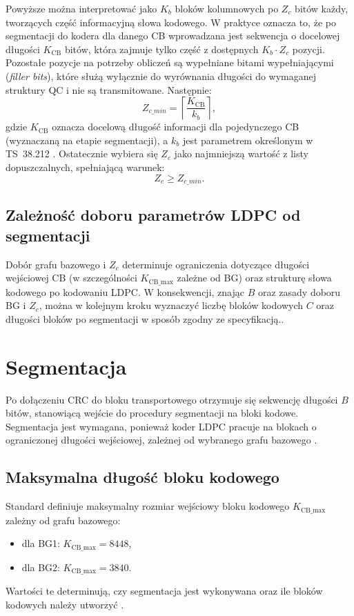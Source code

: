 Powyższe można interpretować jako $K_b$ bloków kolumnowych po $Z_c$ bitów każdy, tworzących część informacyjną słowa kodowego. W praktyce oznacza to, że po segmentacji do kodera dla danego CB wprowadzana jest sekwencja o docelowej długości $K_{\mathrm{CB}}$ bitów, która zajmuje tylko część z dostępnych $K_b \cdot Z_c$ pozycji. Pozostałe pozycje na potrzeby obliczeń są wypełniane bitami wypełniającymi (\emph{filler bits}), które służą wyłącznie do wyrównania długości do wymaganej struktury QC i nie są transmitowane. Następnie:
\begin{equation}
  Z_{c\_min} = \left\lceil \frac{K_{\mathrm{CB}}}{k_b} \right\rceil,
  \label{eq:zc_min}
\end{equation}
gdzie $K_{\mathrm{CB}}$ oznacza docelową długość informacji dla pojedynczego CB (wyznaczaną na etapie segmentacji), a $k_b$ jest parametrem określonym w TS~38.212 \cite{bib:3gpp_38212}. Ostatecznie wybiera się $Z_c$ jako najmniejszą wartość z listy dopuszczalnych, spełniającą warunek:
\begin{equation}
  Z_c \ge Z_{c\_min}.
  \label{eq:zc_choice}
\end{equation}

\subsection{Zależność doboru parametrów LDPC od segmentacji}
Dobór grafu bazowego i $Z_c$ determinuje ograniczenia dotyczące długości wejściowej CB (w szczególności $K_{\mathrm{CB\_max}}$ zależne od BG) oraz strukturę słowa kodowego po kodowaniu LDPC. W konsekwencji, znając $B$ oraz zasady doboru BG i $Z_c$, można w kolejnym kroku wyznaczyć liczbę bloków kodowych $C$ oraz długości bloków po segmentacji w sposób zgodny ze specyfikacją.\cite{bib:3gpp_38212}.





\section{Segmentacja}
\label{sec:analiza_segmentacja}

Po dołączeniu CRC do bloku transportowego otrzymuje się sekwencję długości $B$ bitów, stanowiącą wejście do procedury segmentacji na bloki kodowe. Segmentacja jest wymagana, ponieważ koder LDPC pracuje na blokach o ograniczonej długości wejściowej, zależnej od wybranego grafu bazowego \cite{bib:3gpp_38212}.

\subsection{Maksymalna długość bloku kodowego}
Standard definiuje maksymalny rozmiar wejściowy bloku kodowego $K_{\mathrm{CB\_max}}$ zależny od grafu bazowego:
\begin{itemize}
  \item dla BG1: $K_{\mathrm{CB\_max}} = 8448$,
  \item dla BG2: $K_{\mathrm{CB\_max}} = 3840$.
\end{itemize}
Wartości te determinują, czy segmentacja jest wykonywana oraz ile bloków kodowych należy utworzyć \cite{bib:3gpp_38212}.

